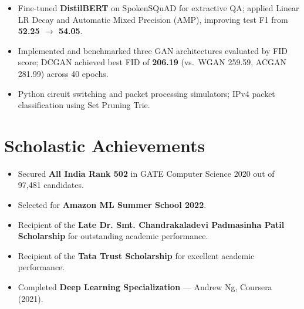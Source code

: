 \documentclass{resume}
\begin{document}
\begin{itemize}\setlength{\itemsep}{0pt}\setlength{\parskip}{0pt}
    \item Fine-tuned \textbf{DistilBERT} on SpokenSQuAD for extractive QA; applied Linear LR Decay and Automatic Mixed Precision (AMP), improving test F1 from \textbf{52.25 $\rightarrow$ 54.05}.
\end{itemize}

\begin{itemize}\setlength{\itemsep}{0pt}\setlength{\parskip}{0pt}
    \item Implemented and benchmarked three GAN architectures evaluated by FID score; DCGAN achieved best FID of \textbf{206.19} (vs.\ WGAN 259.59, ACGAN 281.99) across 40 epochs.
\end{itemize}

\begin{itemize}\setlength{\itemsep}{0pt}\setlength{\parskip}{0pt}
    \item Python circuit switching and packet processing simulators; IPv4 packet classification using Set Pruning Trie.
\end{itemize}

\section{Scholastic Achievements}
\begin{itemize}\setlength{\itemsep}{0pt}\setlength{\parskip}{0pt}
    \item Secured \textbf{All India Rank 502} in GATE Computer Science 2020 out of 97,481 candidates.
    \item Selected for \textbf{Amazon ML Summer School 2022}.
    \item Recipient of the \textbf{Late Dr. Smt. Chandrakaladevi Padmasinha Patil Scholarship} for outstanding academic performance.
    \item Recipient of the \textbf{Tata Trust Scholarship} for excellent academic performance.
    \item Completed \textbf{Deep Learning Specialization} --- Andrew Ng, Coursera (2021).
\end{itemize}

\end{document}
